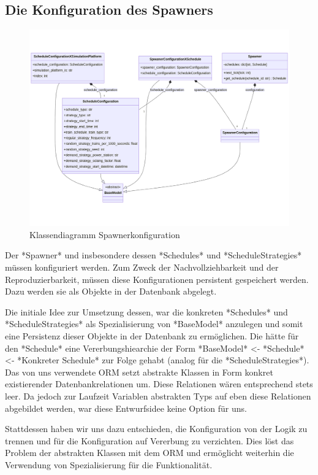 \subsection{Die Konfiguration des Spawners}

\begin{figure}[!hb]
	\centering
	\includegraphics[width=0.75\linewidth]{images/diagrams/spawner-config-class.png}
	\caption{Klassendiagramm Spawnerkonfiguration}
	\label{fig:spawner-config-class}
\end{figure}

Der *Spawner* und insbesondere dessen *Schedules* und *ScheduleStrategies* müssen konfiguriert werden. Zum Zweck der Nachvollziehbarkeit und der Reproduzierbarkeit, müssen diese Konfigurationen persistent gespeichert werden. Dazu werden sie als Objekte in der Datenbank abgelegt.

Die initiale Idee zur Umsetzung dessen, war die konkreten *Schedules* und *ScheduleStrategies* als Spezialisierung von *BaseModel* anzulegen und somit eine Persistenz dieser Objekte in der Datenbank zu ermöglichen. Die hätte für den *Schedule* eine Vererbungshiearchie der Form *BaseModel* <- *Schedule* <- *Konkreter Schedule* zur Folge gehabt (analog für die *ScheduleStrategies*). Das von uns verwendete ORM setzt abstrakte Klassen in Form konkret existierender Datenbankrelationen um. Diese Relationen wären entsprechend stets leer. Da jedoch zur Laufzeit Variablen abstrakten Typs auf eben diese Relationen abgebildet werden, war diese Entwurfsidee keine Option für uns.

Stattdessen haben wir uns dazu entschieden, die Konfiguration von der Logik zu trennen und für die Konfiguration auf Vererbung zu verzichten. Dies löst das Problem der abstrakten Klassen mit dem ORM und ermöglicht weiterhin die Verwendung von Spezialisierung für die Funktionalität.

